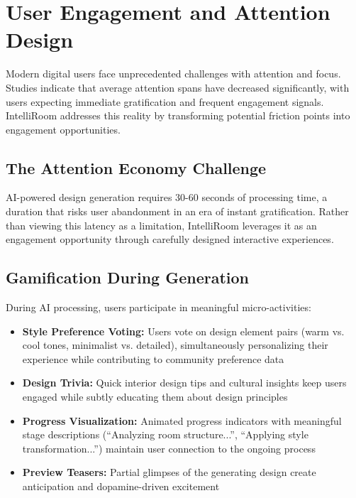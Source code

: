\section{User Engagement and Attention Design}
\label{sec:user_engagement}

Modern digital users face unprecedented challenges with attention and focus. Studies indicate that average attention spans have decreased significantly, with users expecting immediate gratification and frequent engagement signals. IntelliRoom addresses this reality by transforming potential friction points into engagement opportunities.

\subsection{The Attention Economy Challenge}

AI-powered design generation requires 30-60 seconds of processing time, a duration that risks user abandonment in an era of instant gratification. Rather than viewing this latency as a limitation, IntelliRoom leverages it as an engagement opportunity through carefully designed interactive experiences.

\subsection{Gamification During Generation}

During AI processing, users participate in meaningful micro-activities:

\begin{itemize}
    \item \textbf{Style Preference Voting:} Users vote on design element pairs (warm vs. cool tones, minimalist vs. detailed), simultaneously personalizing their experience while contributing to community preference data
    \item \textbf{Design Trivia:} Quick interior design tips and cultural insights keep users engaged while subtly educating them about design principles
    \item \textbf{Progress Visualization:} Animated progress indicators with meaningful stage descriptions (``Analyzing room structure...'', ``Applying style transformation...'') maintain user connection to the ongoing process
    \item \textbf{Preview Teasers:} Partial glimpses of the generating design create anticipation and dopamine-driven excitement
\end{itemize}

